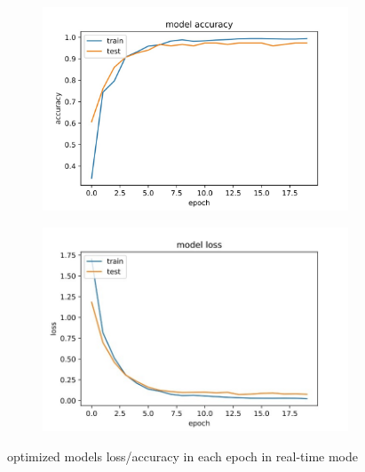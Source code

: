 \begin{figure}
    \centering
    \begin{subfigure}[b]{0.2\textwidth}
        \includegraphics[width=\textwidth]{figures/Opt_RT/acc.jpg}
    \end{subfigure}
    \begin{subfigure}[b]{0.2\textwidth}
        \includegraphics[width=\textwidth]{figures/Opt_RT/loss.jpg}
    \end{subfigure}
    
    \caption{\centering
    optimized models loss/accuracy in each epoch in real-time mode
    }
    \label{fig:org_rt}
\end{figure}








